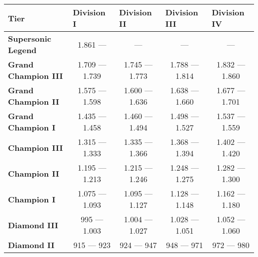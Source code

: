 \begin{table}[]
    \begin{tabular}{|l|c|c|c|c|}
    \hline
    \textbf{Tier}                 & \multicolumn{1}{l|}{\textbf{Division I}} & \multicolumn{1}{l|}{\textbf{Division II}} & \multicolumn{1}{l|}{\textbf{Division III}} & \multicolumn{1}{l|}{\textbf{Division IV}} \\ \hline
    \textbf{Supersonic   Legend}  & 1.861 —                             & —                                         & —                                          & —                                         \\ \hline
    \textbf{Grand Champion   III} & 1.709 — 1.739                            & 1.745 — 1.773                             & 1.788 — 1.814                              & 1.832 — 1.860                             \\ \hline
    \textbf{Grand Champion   II}  & 1.575 — 1.598                            & 1.600 — 1.636                             & 1.638 — 1.660                              & 1.677 — 1.701                             \\ \hline
    \textbf{Grand Champion I}     & 1.435 — 1.458                            & 1.460 — 1.494                             & 1.498 — 1.527                              & 1.537 — 1.559                             \\ \hline
    \textbf{Champion III}         & 1.315 — 1.333                            & 1.335 — 1.366                             & 1.368 — 1.394                              & 1.402 — 1.420                             \\ \hline
    \textbf{Champion II}          & 1.195 — 1.213                            & 1.215 — 1.246                             & 1.248 — 1.275                              & 1.282 — 1.300                             \\ \hline
    \textbf{Champion I}           & 1.075 — 1.093                            & 1.095 — 1.127                             & 1.128 — 1.148                              & 1.162 — 1.180                             \\ \hline
    \textbf{Diamond III}          & 995 — 1.003                              & 1.004 — 1.027                             & 1.028 — 1.051                              & 1.052 — 1.060                             \\ \hline
    \textbf{Diamond II}           & 915 — 923                                & 924 — 947                                 & 948 — 971                                  & 972 — 980                                 \\ \hline

\end{tabular}
\end{table}
